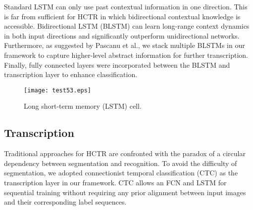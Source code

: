 \documentclass[10pt,conference,a4paper]{IEEEtran}
\begin{document}
Standard LSTM can only use past contextual information in one direction. This is far from sufficient for HCTR in which bidirectional contextual knowledge is accessible.
Bidirectional LSTM (BLSTM) can learn long-range context dynamics in both input directions and significantly outperform unidirectional networks.
Furthermore, as suggested by Pascanu et al.\cite{pascanu2013construct}, we stack multiple BLSTMs in our framework to capture higher-level abstract information for further transcription. 
Finally, fully connected layers were incorporated between the BLSTM and transcription layer to enhance classification.



\begin{figure}[t]
\centering
\texttt{[image: test53.eps]}
\caption{Long short-term memory (LSTM) cell.}
\label{LSTM}
\end{figure}



\subsection{Transcription}
Traditional approaches for HCTR are confronted with the paradox of a circular dependency between segmentation and recognition.
To avoid the difficulty of segmentation, we adopted connectionist temporal classification (CTC) as the transcription layer in our framework. CTC allows an FCN and LSTM for sequential training without requiring any prior alignment between input images and their corresponding label sequences.
\end{document}
